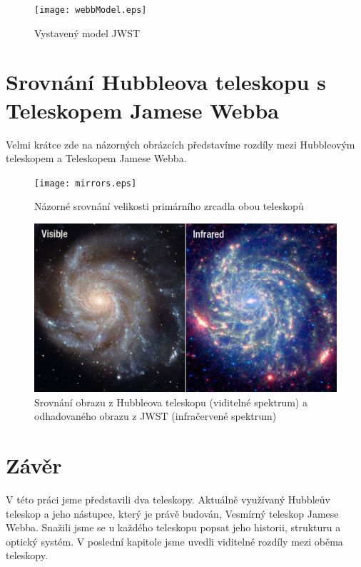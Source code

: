 \documentclass[a4paper,11pt]{article}
\begin{document}
\begin{figure}[h]
\begin{center}
\texttt{[image: webbModel.eps]}
\caption{Vystavený model JWST}
\end{center}
\end{figure}

\section{Srovnání Hubbleova teleskopu s Teleskopem Jamese Webba}
Velmi krátce zde na názorných obrázcích představíme rozdíly mezi Hubbleovým teleskopem a Teleskopem Jamese Webba.

\begin{figure}[h]
\begin{center}
\texttt{[image: mirrors.eps]}
\caption{Názorné srovnání velikosti primárního zrcadla obou teleskopů}
\end{center}
\end{figure}

\begin{figure}[h]
\begin{center}
\includegraphics[width=16cm]{compare.jpg}
\caption{Srovnání obrazu z Hubbleova teleskopu (viditelné spektrum) a odhadovaného obrazu z JWST (infračervené spektrum)}
\end{center}
\end{figure}

\section{Závěr}
V této práci jsme představili dva teleskopy. Aktuálně využívaný Hubbleův teleskop a jeho nástupce, který je právě budován, Vesmírný teleskop Jamese Webba. Snažili jsme se u každého teleskopu popsat jeho historii, strukturu a optický systém. V poslední kapitole jsme uvedli viditelné rozdíly mezi oběma teleskopy.
\newpage


\def\refname{Použitá literatura}

\end{document}

